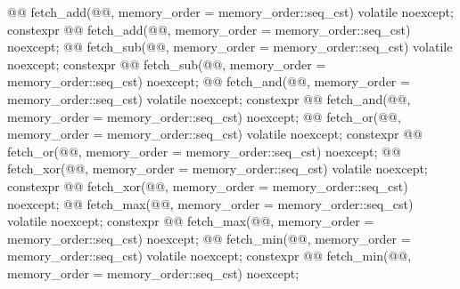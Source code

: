 \begin{codeblock}
{{    @@ fetch_add(@@,
                            memory_order = memory_order::seq_cst) volatile noexcept;
    constexpr @@ fetch_add(@@,
                                      memory_order = memory_order::seq_cst) noexcept;
    @@ fetch_sub(@@,
                            memory_order = memory_order::seq_cst) volatile noexcept;
    constexpr @@ fetch_sub(@@,
                                      memory_order = memory_order::seq_cst) noexcept;
    @@ fetch_and(@@,
                            memory_order = memory_order::seq_cst) volatile noexcept;
    constexpr @@ fetch_and(@@,
                                      memory_order = memory_order::seq_cst) noexcept;
    @@ fetch_or(@@,
                           memory_order = memory_order::seq_cst) volatile noexcept;
    constexpr @@ fetch_or(@@,
                                     memory_order = memory_order::seq_cst) noexcept;
    @@ fetch_xor(@@,
                            memory_order = memory_order::seq_cst) volatile noexcept;
    constexpr @@ fetch_xor(@@,
                                      memory_order = memory_order::seq_cst) noexcept;
    @@ fetch_max(@@,
                            memory_order = memory_order::seq_cst) volatile noexcept;
    constexpr @@ fetch_max(@@,
                                      memory_order = memory_order::seq_cst) noexcept;
    @@ fetch_min(@@,
                            memory_order = memory_order::seq_cst) volatile noexcept;
    constexpr @@ fetch_min(@@,
                                      memory_order = memory_order::seq_cst) noexcept;

}}
\end{codeblock}
